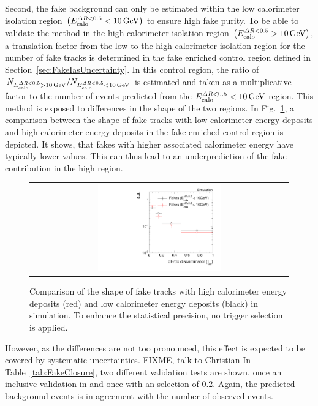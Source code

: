 Second, the fake background can only be estimated within the low calorimeter isolation region $\left(E^{\Delta R<0.5}_{\text{calo}}<10\,\text{Ge}\kern-0.06667em\text{V}\right)$ to ensure high fake purity.
To be able to validate the method in the high calorimeter isolation region $\left(E^{\Delta R<0.5}_{\text{calo}}>10\,\text{Ge}\kern-0.06667em\text{V}\right)$, a translation factor from the low to the high calorimeter isolation region for the number of fake tracks is determined in the fake enriched control region \fakeCR defined in Section~\ref{sec:FakeIasUncertainty}.
In this control region, the ratio of $N_{E^{\Delta R<0.5}_{\text{calo}}>10\,\text{Ge}\kern-0.06667em\text{V}}/N_{E^{\Delta R<0.5}_{\text{calo}}<10\,\text{Ge}\kern-0.06667em\text{V}}$ is estimated and taken as a multiplicative factor to the number of events predicted from the $E^{\Delta R<0.5}_{\text{calo}}<10\,\text{Ge}\kern-0.06667em\text{V}$ region.
This method is exposed to differences in the \ias shape of the two \ecalo regions.
In Fig.~\ref{fig:IasValidate}, a comparison between the \ias shape of fake tracks with low calorimeter energy deposits and high calorimeter energy deposits in the fake enriched control region is depicted.
It shows, that fakes with higher associated calorimeter energy have typically lower \ias values. This can thus lead to an underprediction of the fake contribution in the high \ecalo region.
\begin{figure}[!h]
  \centering 
  \begin{tabular}{c}
    \includegraphics[width=0.49\textwidth]{figures/analysis_2/Background/IasForFakes_chiTrackspreselectionNoTrigger.pdf}
  \end{tabular}
  \caption{Comparison of the \ias shape of fake tracks with high calorimeter energy deposits (red) and low calorimeter energy deposits (black) in simulation.
           To enhance the statistical precision, no trigger selection is applied.}
  \label{fig:IasValidate}
\end{figure}
However, as the differences are not too pronounced, this effect is expected to be covered by systematic uncertainties. FIXME, talk to Christian
In Table~\ref{tab:FakeClosure}, two different validation tests are shown, once an inclusive validation in \ias and once with an \ias selection of 0.2.
Again, the predicted background events is in agreement with the number of observed events.


